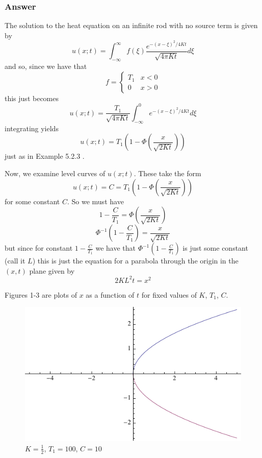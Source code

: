 \documentclass[12pt]{article}
\begin{document}
\subsubsection{Answer}

The solution to the heat equation on an infinite rod with no source term is given \cite[Page 297]{pinsky} by
\[u(x;t)=\int_{-\infty}^\infty f(\xi) \frac{e^{-(x-\xi)^2/4 K t}}{\sqrt{4 \pi K t}} d\xi\]
and so, since we have that 
\[f= \left\{ \begin{array}{cc} T_1 & x<0 \\ 0 & x>0\end{array} \right. \]
this just becomes 
\[u(x;t)= \frac{T_1}{\sqrt{4 \pi K t}} \int_{-\infty}^0  e^{-(x-\xi)^2/4 K t} d\xi\]
integrating yields
\[u(x;t)=T_1\left(1-\Phi \left( \frac{x}{\sqrt{2 K t}} \right) \right) \]
just as in Example 5.2.3 \cite[Page 301]{pinsky}. 

Now, we examine level curves of $u(x;t)$. These take the form
\[u(x;t)=C=T_1\left(1-\Phi \left( \frac{x}{\sqrt{2 K t}} \right) \right) \]
for some constant $C$. So we must have
\[1- \frac{C}{T_1}=\Phi \left( \frac{x}{\sqrt{2 K t}} \right)  \]
\[\Phi ^{-1} \left (1- \frac{C}{T_1} \right)=  \frac{x}{\sqrt{2 K t}}   \]
but since for constant $  1- \frac{C}{T_1}  $ we have that $\Phi^{-1} \left (1- \frac{C}{T_1} \right)$ is just some constant (call it $L$) this is just the equation for a parabola through the origin in the $(x, t)$ plane given by 
\[2 K L^2 t = x^2\]

Figures 1-3 are plots of $x$ as a function of $t$ for fixed values of $K$, $T_1$, $C$.

   \begin{figure}
      \centering
      \includegraphics{c10.pdf}
      \caption{$K= \frac{1}{2}$, $T_1=100$, $C=10$}
   \end{figure}
\end{document}
